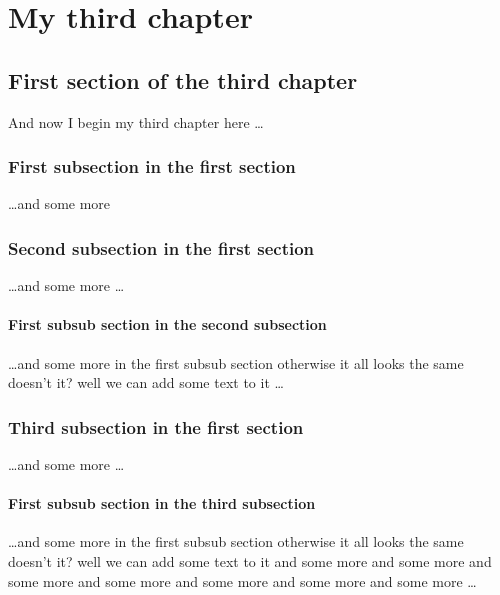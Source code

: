 \chapter{My third chapter}

\ifpdf
  \graphicspath{{Chapter3/Figs/Raster/}{Chapter3/Figs/PDF/}{Chapter3/Figs/}}
\else
  \graphicspath{{Chapter3/Figs/Vector/}{Chapter3/Figs/}}
\fi

\section{First section of the third chapter}
And now I begin my third chapter here \dots


\subsection{First subsection in the first section}
\dots and some more

\subsection{Second subsection in the first section}
\dots and some more \dots

\subsubsection{First subsub section in the second subsection}
\dots and some more in the first subsub section otherwise it all looks the same
doesn't it? well we can add some text to it \dots

\subsection{Third subsection in the first section}
\dots and some more \dots

\subsubsection{First subsub section in the third subsection}
\dots and some more in the first subsub section otherwise it all looks the same
doesn't it? well we can add some text to it and some more and some more and
some more and some more and some more and some more and some more \dots

